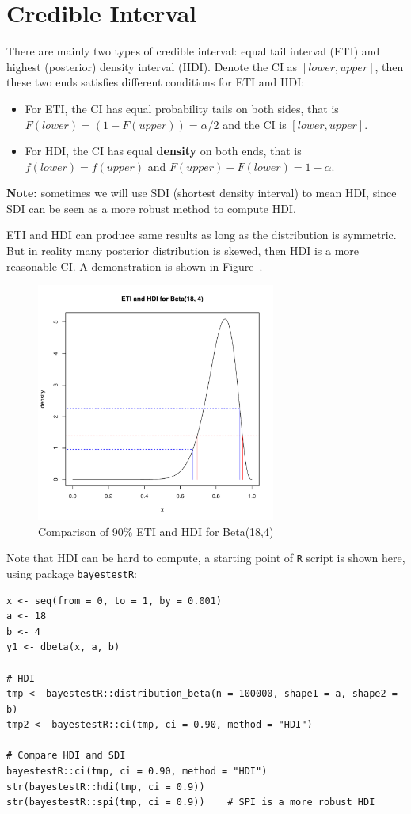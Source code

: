 \documentclass[a4paper,12pt]{article}
\begin{document}
\section{Credible Interval}
\label{sec:credible-interval}

There are mainly two types of credible interval: equal tail interval (ETI) and highest (posterior) density interval (HDI). Denote the CI as $[lower, upper]$, then these two ends satisfies different conditions for ETI and HDI:
\begin{itemize}
\item For ETI, the CI has equal probability tails on both sides, that is $F\left(lower\right) = (1 - F(upper)) = \alpha / 2$ and the CI is $[lower, upper]$.
\item For HDI, the CI has equal \textbf{density} on both ends, that is $f\left(lower\right) = f\left(upper\right)$ and $F\left(upper\right) - F\left(lower\right) = 1 - \alpha$. 
\end{itemize}
\textbf{Note:} sometimes we will use SDI (shortest density interval) to mean HDI, since SDI can be seen as a more robust method to compute HDI\citep{Liu2015p809-819}.
\par
ETI and HDI can produce same results as long as the distribution is symmetric. But in reality many posterior distribution is skewed, then HDI is a more reasonable CI. A demonstration is shown in Figure~.
\begin{figure}[htbp]
  \centering
  \includegraphics[width = 0.7\textwidth]{eti_and_hdi}
  \caption{Comparison of 90\% ETI and HDI for Beta(18,4)}
  \label{fig:eti_and_hdi}
\end{figure}
Note that HDI can be hard to compute, a starting point of \texttt{R} script is shown here, using package
\texttt{bayestestR}:
\begin{verbatim}
x <- seq(from = 0, to = 1, by = 0.001)
a <- 18
b <- 4
y1 <- dbeta(x, a, b)

# HDI
tmp <- bayestestR::distribution_beta(n = 100000, shape1 = a, shape2 = b)
tmp2 <- bayestestR::ci(tmp, ci = 0.90, method = "HDI")

# Compare HDI and SDI
bayestestR::ci(tmp, ci = 0.90, method = "HDI")
str(bayestestR::hdi(tmp, ci = 0.9))
str(bayestestR::spi(tmp, ci = 0.9))    # SPI is a more robust HDI
\end{verbatim}
\end{document}
